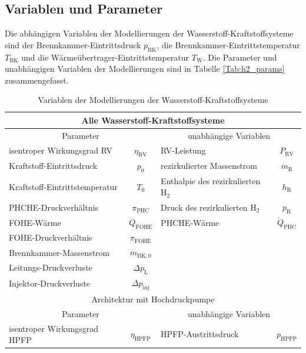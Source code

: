 \subsection{Variablen und Parameter}

Die abhängigen Variablen der Modellierungen der Wasserstoff-Kraftstoffsysteme sind der Brennkammer-Eintrittsdruck $p_{\mathrm{BK}}$, die Brennkammer-Eintrittstemperatur $T_\mathrm{BK}$ und die Wärmeübertrager-Eintrittstemperatur $T_\mathrm{W}$. Die Parameter und unabhängigen Variablen der Modellierungen sind in Tabelle \ref{Tab:h2_params} zusammengefasst.

\begin{table}[ht]
    \centering
	\caption{Variablen der Modellierungen der Wasserstoff-Kraftstoffsysteme}
	\begin{tabular} {|l|c|l|c|} \hline%
    \multicolumn{4}{|c}{Alle Wasserstoff-Kraftstoffsysteme}\\ \hline
    \multicolumn{2}{|c}{Parameter} & \multicolumn{2}{|c|}{unabhängige Variablen}\\ \hline\hline%
    isentroper Wirkungsgrad RV & $\eta_\mathrm{RV}$ & RV-Leistung & $P_{\mathrm{RV}}$ \\ \hline
    Kraftstoff-Eintrittsdruck & $p_0$ & rezirkulierter Massenstrom & $\dot{m}_\mathrm{R}$ \\ \hline
    Kraftstoff-Eintrittstemperatur & $T_0$ & Enthalpie des rezirkulierten H$_2$ & $h_\mathrm{R}$ \\ \hline
    PHCHE-Druckverhältnis  & $\pi_{\mathrm{PHC}}$ & Druck des rezirkulierten H$_2$ & $p_\mathrm{R}$\\ \hline
    FOHE-Wärme & $\dot{Q}_{\mathrm{FOHE}}$ & PHCHE-Wärme  & $\dot{Q}_{\mathrm{PHC}}$\\ \hline
    FOHE-Druckverhältnis & $\pi_{\mathrm{FOHE}}$ & \multicolumn{2}{c|}{}\\ \hline
    Brennkammer-Massenstrom & $\dot{m}_{\mathrm{BK},0}$ & \multicolumn{2}{c|}{}\\ \hline
    Leitungs-Druckverluste & $\Delta p_{\mathrm{L}}$ & \multicolumn{2}{c|}{}\\ \hline
    Injektor-Druckverluste & $\Delta p_{\mathrm{inj}}$ & \multicolumn{2}{c|}{}\\ \hline\hline
	\multicolumn{4}{|c|}{Architektur mit Hochdruckpumpe}\\ \hline
    \multicolumn{2}{|c}{Parameter} & \multicolumn{2}{|c|}{unabhängige Variablen}\\ \hline\hline%
    isentroper Wirkungsgrad HPFP & $\eta_{\mathrm{HPFP}}$ & HPFP-Austrittsdruck & $p_{\mathrm{HPFP}}$ \\ \hline

\end{tabular}
\end{table}
